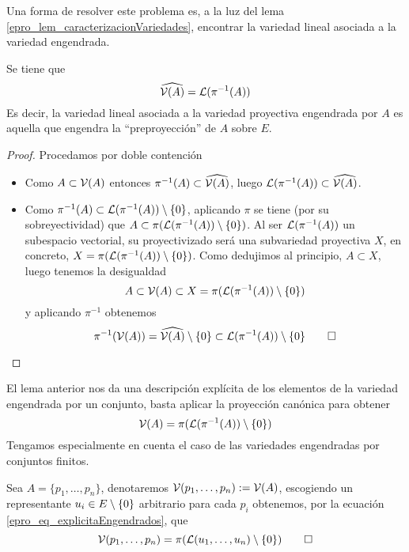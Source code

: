 Una forma de resolver este problema es, a la luz del lema \ref{epro_lem_caracterizacionVariedades}, encontrar la variedad lineal asociada a la variedad engendrada.
\begin{lem}
	Se tiene que \[\widehat{\mathcal{V}(A)}=\mathcal{L}(\pi^{-1}(A))\]
	Es decir, la variedad lineal asociada a la variedad proyectiva engendrada por $A$ es aquella que engendra la ``preproyección'' de $A$ sobre $E$.
\end{lem}
\begin{proof}
	Procedamos por doble contención
	\begin{itemize}
		\item[\bsupset] Como $A\subset\mathcal{V}(A)$ entonces $\pi^{-1}(A)\subset\widehat{\mathcal{V}(A)}$, luego $\mathcal{L}(\pi^{-1}(A))\subset\widehat{\mathcal{V}(A)}$.
		\item[\bsubset]Como $\pi^{-1}(A)\subset\mathcal{L}(\pi^{-1}(A))\setminus\{0\}$, aplicando $\pi$ se tiene (por su sobreyectividad) que $A\subset \pi(\mathcal{L}(\pi^{-1}(A))\setminus\{0\})$. Al ser $\mathcal{L}(\pi^{-1}(A))$ un subespacio vectorial, su proyectivizado será una subvariedad proyectiva $X$, en concreto, $X=\pi(\mathcal{L}(\pi^{-1}(A))\setminus\{0\})$. Como dedujimos al principio, $A\subset X$, luego tenemos la desigualdad
		\begin{equation*}
			A\subset\mathcal{V}(A)\subset X=\pi(\mathcal{L}(\pi^{-1}(A))\setminus\{0\})
		\end{equation*}
		y aplicando $\pi^{-1}$ obtenemos
		\begin{equation*}
			\pi^{-1}(\mathcal{V}(A))=\widehat{\mathcal{V}(A)}\setminus\{0\}\subset\mathcal{L}(\pi^{-1}(A))\setminus\{0\}\qedhere
		\end{equation*}
	\end{itemize}
\end{proof}
El lema anterior nos da una descripción explícita de los elementos de la variedad engendrada por un conjunto, basta aplicar la proyección canónica para obtener
\begin{equation}\label{epro_eq_explicitaEngendrados}
	\mathcal{V}(A)=\pi(\mathcal{L}(\pi^{-1}(A))\setminus\{0\})
\end{equation}
Tengamos especialmente en cuenta el caso de las variedades engendradas por conjuntos finitos.
\begin{exa}
	\label{C1_exa_generadoresFinitos}
	Sea $A=\{p_1,\dots,p_n\}$, denotaremos $\mathcal{V}(p_1,\dots,p_n):=\mathcal{V}(A)$, escogiendo un representante $u_i\in E\setminus\{0\}$ arbitrario para cada $p_i$ obtenemos, por la ecuación \eqref{epro_eq_explicitaEngendrados}, que
	\begin{equation*}
		\mathcal{V}(p_1,\dots,p_n)=\pi(\mathcal{L}(u_1,\dots,u_n)\setminus\{0\})\qedhere
	\end{equation*}
\end{exa}
